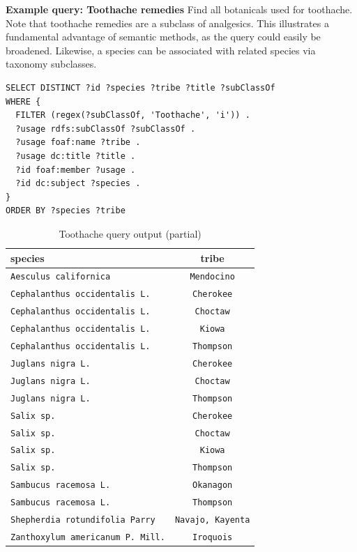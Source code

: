 \documentclass{acm_proc_article-sp}
\newcommand{\head}[1]{\textnormal{\textbf{#1}}}
\begin{document}
\textbf{Example query: Toothache remedies}
Find all botanicals used for toothache. Note that toothache remedies are a subclass of analgesics. This illustrates a fundamental advantage of semantic methods, as the query could easily be broadened. Likewise, a species can be associated with related species via taxonomy subclasses.
\begin{lstlisting}
SELECT DISTINCT ?id ?species ?tribe ?title ?subClassOf
WHERE {
  FILTER (regex(?subClassOf, 'Toothache', 'i')) .
  ?usage rdfs:subClassOf ?subClassOf . 
  ?usage foaf:name ?tribe . 
  ?usage dc:title ?title . 
  ?id foaf:member ?usage . 
  ?id dc:subject ?species .
}
ORDER BY ?species ?tribe
\end{lstlisting}


\begin{table}[h]
	\centering
	\caption{Toothache query output (partial)}
	\begin{tabular}{|L|c|}
		\hline
		\head{species} & \head{tribe} \\
		\hline
\texttt{Aesculus californica} & \texttt{Mendocino} \\
\texttt{Cephalanthus occidentalis L.} & \texttt{Cherokee} \\
\texttt{Cephalanthus occidentalis L.} & \texttt{Choctaw} \\
\texttt{Cephalanthus occidentalis L.} & \texttt{Kiowa} \\
\texttt{Cephalanthus occidentalis L.} & \texttt{Thompson} \\
\texttt{Juglans nigra L.} & \texttt{Cherokee} \\
\texttt{Juglans nigra L.} & \texttt{Choctaw} \\
\texttt{Juglans nigra L.} & \texttt{Thompson} \\
\texttt{Salix sp.} & \texttt{Cherokee} \\
\texttt{Salix sp.} & \texttt{Choctaw} \\
\texttt{Salix sp.} & \texttt{Kiowa} \\
\texttt{Salix sp.} & \texttt{Thompson} \\
\texttt{Sambucus racemosa L.} & \texttt{Okanagon} \\
\texttt{Sambucus racemosa L.} & \texttt{Thompson} \\
\texttt{Shepherdia rotundifolia Parry} & \texttt{Navajo, Kayenta} \\
\texttt{Zanthoxylum americanum P. Mill.} & \texttt{Iroquois} \\
\hline
	\end{tabular}
\end{table}
\end{document}
